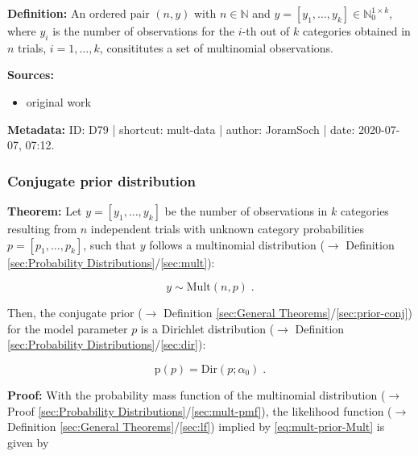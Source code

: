 \documentclass[a4paper,12pt,twoside]{book}
\begin{document}
\textbf{Definition:} An ordered pair $(n,y)$ with $n \in \mathbb{N}$ and $y = \left[ y_1, \ldots, y_k \right] \in \mathbb{N}_0^{1 \times k}$, where $y_i$ is the number of observations for the $i$-th out of $k$ categories obtained in $n$ trials, $i = 1, \ldots, k$, consititutes a set of multinomial observations.


\vspace{1em}
\textbf{Sources:}
\begin{itemize}
\item original work\end{itemize}


\vspace{1em}
\textbf{Metadata:} ID: D79 | shortcut: mult-data | author: JoramSoch | date: 2020-07-07, 07:12.
\vspace{1em}



\subsubsection[\textbf{Conjugate prior distribution}]{Conjugate prior distribution} \label{sec:mult-prior}
\setcounter{equation}{0}

\textbf{Theorem:} Let $y = [y_1, \ldots, y_k]$ be the number of observations in $k$ categories resulting from $n$ independent trials with unknown category probabilities $p = [p_1, \ldots, p_k]$, such that $y$ follows a multinomial distribution ($\rightarrow$ Definition \ref{sec:Probability Distributions}/\ref{sec:mult}):

\begin{equation} \label{eq:mult-prior-Mult}
y \sim \mathrm{Mult}(n,p) \; .
\end{equation}

Then, the conjugate prior ($\rightarrow$ Definition \ref{sec:General Theorems}/\ref{sec:prior-conj}) for the model parameter $p$ is a Dirichlet distribution ($\rightarrow$ Definition \ref{sec:Probability Distributions}/\ref{sec:dir}):

\begin{equation} \label{eq:mult-prior-Dir}
\mathrm{p}(p) = \mathrm{Dir}(p; \alpha_0) \; .
\end{equation}


\vspace{1em}
\textbf{Proof:} With the probability mass function of the multinomial distribution ($\rightarrow$ Proof \ref{sec:Probability Distributions}/\ref{sec:mult-pmf}), the likelihood function ($\rightarrow$ Definition \ref{sec:General Theorems}/\ref{sec:lf}) implied by \eqref{eq:mult-prior-Mult} is given by
\end{document}
